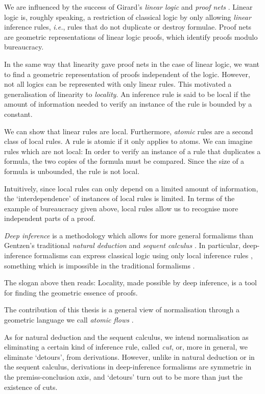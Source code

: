 
We are influenced by the success of Girard's \emph{linear logic} and \emph{proof nets} \cite{Gira:87:Linear-L:wm}. Linear logic is, roughly speaking, a restriction of classical logic by only allowing \emph{linear} inference rules, \emph{i.e.}, rules that do not duplicate or destroy formulae. Proof nets are geometric representations of linear logic proofs, which identify proofs modulo bureaucracy.

In the same way that linearity gave proof nets in the case of linear logic, we want to find a geometric representation of proofs independent of the logic. However, not all logics can be represented with only linear rules. This motivated a generalisation of linearity to \emph{locality}. An inference rule is said to be local if the amount of information needed to verify an instance of the rule is bounded by a constant.

We can show that linear rules are local. Furthermore, \emph{atomic} rules are a second class of local rules. A rule is atomic if it only applies to atoms. We can imagine rules which are not local: In order to verify an instance of a rule that duplicates a formula, the two copies of the formula must be compared. Since the size of a formula is unbounded, the rule is not local.

Intuitively, since local rules can only depend on a limited amount of information, the `interdependence' of instances of local rules is limited. In terms of the example of bureaucracy given above, local rules allow us to recognise more independent parts of a proof.

\emph{Deep inference} \cite{Gugl:06:A-System:kl} is a methodology which allows for more general formalisms than Gentzen's traditional \emph{natural deduction} and \emph{sequent calculus} \cite{Gent:69:Investig:xi}. In particular, deep-inference formalisms can express classical logic using only local inference rules \cite{BrunTiu:01:A-Local-:mz}, something which is impossible in the traditional formalisms \cite{Brun:03:Two-Rest:mn}.

The slogan above then reads: Locality, made possible by deep inference, is a tool for finding the geometric essence of proofs.

The contribution of this thesis is a general view of normalisation through a geometric language we call \emph{atomic flows} \cite{GuglGund:07:Normalis:lr}.

As for natural deduction and the sequent calculus, we intend normalisation as eliminating a certain kind of inference rule, called \emph{cut}, or, more in general, we eliminate `detours', from derivations. However, unlike in natural deduction or in the sequent calculus, derivations in deep-inference formalisms are symmetric in the premiss-conclusion axis, and `detours' turn out to be more than just the existence of cuts.


